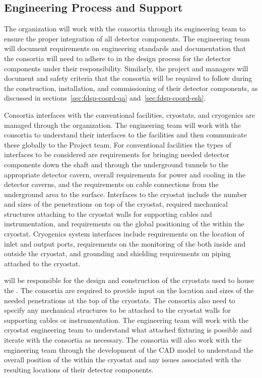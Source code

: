 \subsection{Engineering Process and Support}
\label{sec:fdsp-coord-integ-engr-proc}
 

The  organization will work with
the consortia through its  engineering team to ensure the proper
integration of all detector components.  The  engineering team will
document requirements on engineering standards and documentation that
the consortia will need to adhere to in the design process for the
detector components under their responsibility.  Similarly, the
project  and  managers will document  and safety
criteria that the consortia will be required to follow during the
construction, installation, and commissioning of their detector
components, as discussed in sections~\ref{sec:fdsp-coord-qa}
and~\ref{sec:fdsp-coord-esh}.


Consortia interfaces with the conventional facilities, cryostats, and
cryogenics are managed through the 
organization.  The  engineering team will work with the
consortia to understand their interfaces to the facilities and then
communicate these globally to the  Project team.  For conventional
facilities the types of interfaces to be considered are requirements
for bringing needed detector components down the shaft and through the
underground tunnels to the appropriate detector cavern, overall requirements for
power and cooling in the detector caverns, and the requirements on
cable connections from the underground area to the surface.
Interfaces to the cryostat include the number and sizes of the
penetrations on top of the cryostat, required mechanical structures
attaching to the cryostat walls for supporting cables and
instrumentation, and requirements on the global positioning of the
 within the cryostat.  Cryogenics system interfaces include
requirements on the location of inlet and output ports, requirements on
the monitoring of the \lar both inside and outside the
cryostat, and grounding and shielding requirements on piping attached to
the cryostat.

 will be responsible for the design and construction of the
cryostats used to house the .  The consortia are required to
provide input on the location and sizes of the needed penetrations at
the top of the cryostats.  The consortia also need to specify any
mechanical structures to be attached to the cryostat walls for
supporting cables or instrumentation.  The  engineering
team will work with the  cryostat engineering team to understand
what attached fixturing is possible and iterate with the consortia as
necessary.  The consortia will also work with the  engineering
team through the development of the \threed CAD model to understand the
overall position of the  within the cryostat and any issues
associated with the resulting locations of their detector components.

